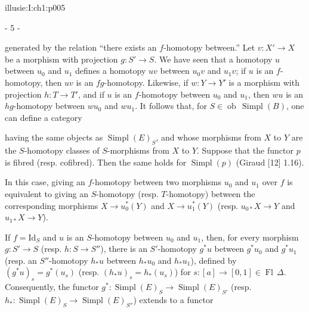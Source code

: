 \IllusieSetPhysicalPageSize{447bp}{698.6bp}
\begin{illusiebodypage}{illusie:I:ch1:p005}
\begin{center}- 5 -\end{center}
\vspace{7bp}\fontsize{9}{18}\selectfont

\hypertarget{illusie:I:ch1:s1:1:p14c1}{}%
\noindent generated by the relation “there exists an $f$-homotopy between.”
Let $v:X'\longrightarrow X$ be a morphism with projection
$g:S'\longrightarrow S$. We have seen that a homotopy $u$ between $u_0$ and
$u_1$ defines a homotopy $uv$ between $u_0v$ and $u_1v$; if $u$ is an
$f$-homotopy, then $uv$ is an $fg$-homotopy. Likewise, if
$w:Y\longrightarrow Y'$ is a morphism with projection
$h:T\longrightarrow T'$, and if $u$ is an $f$-homotopy between $u_0$ and
$u_1$, then $wu$ is an $hg$-homotopy between $wu_0$ and $wu_1$. It follows
that, for $S\in\operatorname{ob}\,\operatorname{Simpl}(B)$, one can define a
category

\hypertarget{illusie:I:ch1:s1:1:eq6}{}%
\noindent{}\par

\hypertarget{illusie:I:ch1:s1:1:p15}{}%
having the same objects as $\operatorname{Simpl}(E)_S$, and whose morphisms
from $X$ to $Y$ are the $S$-homotopy classes of $S$-morphisms from $X$ to $Y$.
Suppose that the functor $p$ is fibred (resp. cofibred). Then the same holds
for $\operatorname{Simpl}(p)$ (Giraud [12] 1.16).

\hypertarget{illusie:I:ch1:s1:1:p16}{}%
In this case, giving an $f$-homotopy between two morphisms $u_0$ and $u_1$
over $f$ is equivalent to giving an $S$-homotopy (resp. $T$-homotopy) between
the corresponding morphisms $X\longrightarrow u_0^*(Y)$ and
$X\longrightarrow u_1^*(Y)$ (resp. $u_{0*}X\longrightarrow Y$ and
$u_{1*}X\longrightarrow Y$).

\hypertarget{illusie:I:ch1:s1:1:p17}{}%
If $f=\mathrm{Id}_S$ and $u$ is an $S$-homotopy between $u_0$ and $u_1$,
then, for every morphism $g:S'\longrightarrow S$ (resp.
$h:S\longrightarrow S''$), there is an $S'$-homotopy $g^*u$ between $g^*u_0$
and $g^*u_1$ (resp. an $S''$-homotopy $h_*u$ between $h_*u_0$ and $h_*u_1$),
\hypertarget{illusie:I:ch1:s1:1:d8}{}%
defined by $(g^*u)_s=g^*(u_s)$ (resp. $(h_*u)_s=h_*(u_s)$) for
$s:[a]\longrightarrow[0,1]\in\operatorname{Fl}\,\Delta$. Consequently, the
functor $g^*:\operatorname{Simpl}(E)_S\longrightarrow
\operatorname{Simpl}(E)_{S'}$ (resp.
$h_*:\operatorname{Simpl}(E)_S\longrightarrow\operatorname{Simpl}(E)_{S''}$)
extends to a functor


\end{illusiebodypage}
